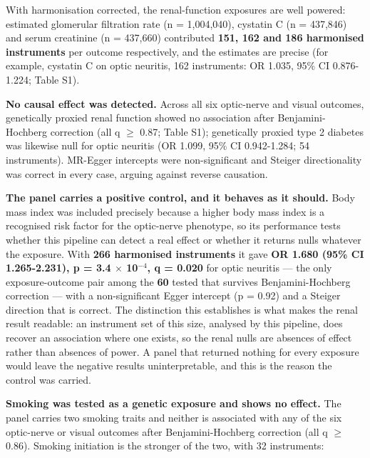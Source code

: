 \documentclass[utf8]{FrontiersinVancouver}
\begin{document}
With harmonisation corrected, the renal-function exposures are well powered: estimated glomerular filtration rate (n = 1,004,040), cystatin C (n = 437,846) and serum creatinine (n = 437,660) contributed \textbf{151, 162 and 186 harmonised instruments} per outcome respectively, and the estimates are precise (for example, cystatin C on optic neuritis, 162 instruments: OR 1.035, 95\% CI 0.876-1.224; Table S1).

\textbf{No causal effect was detected.} Across all six optic-nerve and visual outcomes, genetically proxied renal function showed no association after Benjamini-Hochberg correction (all q $\geq$ 0.87; Table S1); genetically proxied type 2 diabetes was likewise null for optic neuritis (OR 1.099, 95\% CI 0.942-1.284; 54 instruments). MR-Egger intercepts were non-significant and Steiger directionality was correct in every case, arguing against reverse causation.

\textbf{The panel carries a positive control, and it behaves as it should.} Body mass index was included precisely because a higher body mass index is a recognised risk factor for the optic-nerve phenotype, so its performance tests whether this pipeline can detect a real effect or whether it returns nulls whatever the exposure. With \textbf{266 harmonised instruments} it gave \textbf{OR 1.680 (95\% CI 1.265-2.231), p = 3.4 $\times$ 10$^{-4}$, q = 0.020} for optic neuritis --- the only exposure-outcome pair among the \textbf{60} tested that survives Benjamini-Hochberg correction --- with a non-significant Egger intercept (p = 0.92) and a Steiger direction that is correct. The distinction this establishes is what makes the renal result readable: an instrument set of this size, analysed by this pipeline, does recover an association where one exists, so the renal nulls are absences of effect rather than absences of power. A panel that returned nothing for every exposure would leave the negative results uninterpretable, and this is the reason the control was carried.

\textbf{Smoking was tested as a genetic exposure and shows no effect.} The panel carries two smoking traits and neither is associated with any of the six optic-nerve or visual outcomes after Benjamini-Hochberg correction (all q $\geq$ 0.86). Smoking initiation is the stronger of the two, with 32 instruments:
\end{document}
